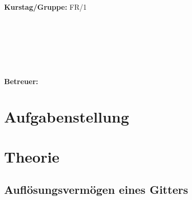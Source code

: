\documentclass{article}
\begin{document}
\begin{verbatim}


\end{verbatim}
			\begin{flushleft}
			\textbf{\Large{Kurstag/Gruppe:}} \Large{FR/1}
			\end{flushleft}

\begin{verbatim}






\end{verbatim}
			\begin{flushleft}
			\LARGE{\textbf{Betreuer:\Large{ }}}		
			\end{flushleft}
			
\section{Aufgabenstellung}

\section{Theorie}
\subsection{Auflösungsvermögen eines Gitters}
\end{document}
